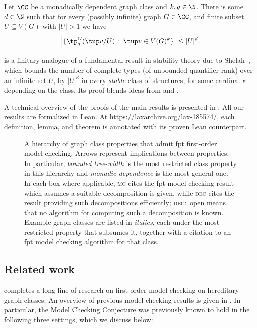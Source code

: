 \begin{theorem}\label{thm:intro-type-bound}
Let $\CC$ be a monadically dependent graph class and $k,q\in\N$. There is some $d\in\N$ such that for every (possibly infinite) graph $G \in \CC$,  and finite subset $U \subseteq V(G)$ with $|U|>1$
we have
\[
  \left|
    \{\tp^{G}_q(\tup v/U) \,:\, \tup v \in V(G)^k \}\right|
    \leq  |U|^d.
\]
\end{theorem}

 is a finitary analogue of a fundamental result in stability theory due to Shelah~\cite{Shelah1969}, which bounds the number of complete types (of unbounded quantifier rank) over an infinite set $U$, by $|U|^\kappa$ in every \emph{stable} class of structures, for some cardinal $\kappa$ depending on the class.
Its proof blends ideas from \cite{number-of-types} and \cite{flippers}.

\medskip
A technical overview of the proofs of the main results is presented in .
All our results are formalized in Lean. At \url{https://laxarchive.org/lax-185574/}, each definition, lemma, and theorem is annotated with its proven Lean counterpart.

\begin{figure}[htb]
  \centering
  
  \caption{A hierarchy of graph class properties that admit fpt first-order model checking.
    Arrows represent implications between properties.
    In particular, \emph{bounded tree-width} is the most restricted class property in this hierarchy and \emph{monadic dependence} is the most general one.
    In each box where applicable, \textsc{mc} cites the fpt model checking result which assumes a suitable decomposition is given, while \textsc{dec} cites the result providing such decompositions efficiently; \textsc{dec:}~open means that no algorithm for computing such a decomposition is known.
    Example graph classes are listed in \textcolor{black!60}{\emph{italics}}, each under the most restricted property that subsumes it, together with a citation to an fpt model checking algorithm for that class.}
  \label{fig:hierarchy}
\end{figure}

\subsection{Related work}
 completes a long line of research on first-order model checking on hereditary graph classes.
An overview of previous model checking results is given in .
In particular, the Model Checking Conjecture was previously known to hold in the following three settings, which we discuss below:


